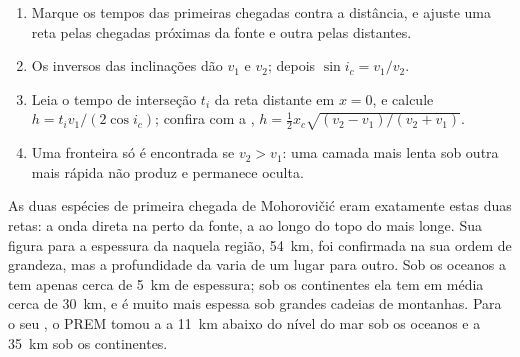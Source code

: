 \begin{method}\label{met:b1:layered-earth:moho}
\begin{enumerate}
  \item Marque os tempos das primeiras chegadas contra a distância, e ajuste uma reta pelas chegadas próximas da fonte e outra pelas distantes.
  \item Os inversos das inclinações dão $v_1$ e $v_2$; depois $\sin i_c = v_1/v_2$.
  \item Leia o tempo de interseção $t_i$ da reta distante em $x = 0$, e calcule $h = t_i v_1/(2\cos i_c)$; confira com a , $h = \tfrac12 x_c\sqrt{(v_2 - v_1)/(v_2 + v_1)}$.
  \item Uma fronteira só é encontrada se $v_2 > v_1$: uma camada mais lenta sob outra mais rápida não produz  e permanece oculta.
\end{enumerate}
\end{method}

As duas espécies de primeira chegada de Mohorovičić eram exatamente estas duas retas: a onda direta na  perto da fonte, a  ao longo do topo do  mais longe. Sua figura para a espessura da  naquela região, \qty{54}{km}, foi confirmada na sua ordem de grandeza, mas a profundidade da  varia de um lugar para outro. Sob os oceanos a  tem apenas cerca de \qty{5}{km} de espessura; sob os continentes ela tem em média cerca de \qty{30}{km}, e é muito mais espessa sob grandes cadeias de montanhas. Para o seu , o PREM tomou a  a \qty{11}{km} abaixo do nível do mar sob os oceanos e a \qty{35}{km} sob os continentes.

